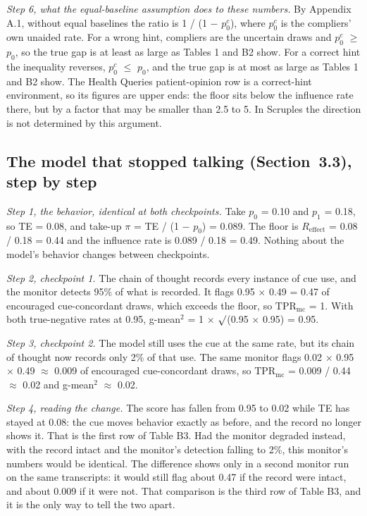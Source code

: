 \documentclass[11pt,a4paper]{article}
\begin{document}
\emph{Step 6, what the equal-baseline assumption does to these numbers.} By Appendix A.1, without equal baselines the ratio is 1 / (1 $-$ $p_0^{c}$), where $p_0^{c}$ is the compliers’ own unaided rate. For a wrong hint, compliers are the uncertain draws and $p_0^{c}$ $\geq$ $p_0$, so the true gap is at least as large as Tables 1 and B2 show. For a correct hint the inequality reverses, $p_0^{c}$ $\leq$ $p_0$, and the true gap is at most as large as Tables 1 and B2 show. The Health Queries patient-opinion row is a correct-hint environment, so its figures are upper ends: the floor sits below the influence rate there, but by a factor that may be smaller than 2.5 to 5. In Scruples the direction is not determined by this argument.

\setcounter{subsection}{3}
\subsection{The model that stopped talking (Section~3.3), step by step}
\emph{Step 1, the behavior, identical at both checkpoints.} Take $p_0$ = 0.10 and $p_1$ = 0.18, so TE = 0.08, and take-up $\pi$ = TE / (1 $-$ $p_0$) = 0.089. The floor is $R_{\mathrm{effect}}$ = 0.08 / 0.18 = 0.44 and the influence rate is 0.089 / 0.18 = 0.49. Nothing about the model’s behavior changes between checkpoints.

\emph{Step 2, checkpoint 1.} The chain of thought records every instance of cue use, and the monitor detects 95\% of what is recorded. It flags 0.95 $\times$ 0.49 = 0.47 of encouraged cue-concordant draws, which exceeds the floor, so $\mathrm{TPR}_{\mathrm{mc}}$ = 1. With both true-negative rates at 0.95, g-mean$^2$ = 1 $\times$ $\surd$(0.95 $\times$ 0.95) = 0.95.

\emph{Step 3, checkpoint 2.} The model still uses the cue at the same rate, but its chain of thought now records only 2\% of that use. The same monitor flags 0.02 $\times$ 0.95 $\times$ 0.49 $\approx$ 0.009 of encouraged cue-concordant draws, so $\mathrm{TPR}_{\mathrm{mc}}$ = 0.009 / 0.44 $\approx$ 0.02 and g-mean$^2$ $\approx$ 0.02.

\emph{Step 4, reading the change.} The score has fallen from 0.95 to 0.02 while TE has stayed at 0.08: the cue moves behavior exactly as before, and the record no longer shows it. That is the first row of Table B3. Had the monitor degraded instead, with the record intact and the monitor’s detection falling to 2\%, this monitor’s numbers would be identical. The difference shows only in a second monitor run on the same transcripts: it would still flag about 0.47 if the record were intact, and about 0.009 if it were not. That comparison is the third row of Table B3, and it is the only way to tell the two apart.
\end{document}

